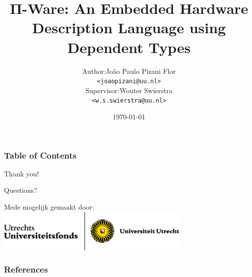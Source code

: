 \documentclass{beamer}
\title[PiWare]{Π-Ware: An Embedded Hardware Description Language using Dependent Types}
\date{\today}
\institute[Utrecht University] {
    Department of Information and Computing Sciences \\
    Utrecht University
}
\begin{document}
    \author[J. P. Pizani Flor]{
        \begin{tabular}{r@{ }l}
            Author:     & João Paulo Pizani Flor \\
                        & \small{\texttt{<joaopizani@uu.nl>}} \\[2ex]
            Supervisor: & Wouter Swierstra \\
                        & \small{\texttt{<w.s.swierstra@uu.nl>}}
        \end{tabular}
    }


    \begin{frame}
        \titlepage
    \end{frame}

    \begin{frame}
        \frametitle{Table of Contents}
        \tableofcontents
    \end{frame}


    
    
    
    


    \begin{frame}[plain]
        \begin{center}
            \par{\Huge{Thank you!}}
            \vspace{1.0cm}
            \par{\Huge{Questions?}}
        \end{center}
            \vfill
            Mede mogelijk gemaakt door:
            \includegraphics[width=0.7\textwidth]{imgs/uufonds.jpg}
    \end{frame}

    \begin{frame}[allowframebreaks]
        \frametitle{References}
        
        
    \end{frame}
\end{document}
